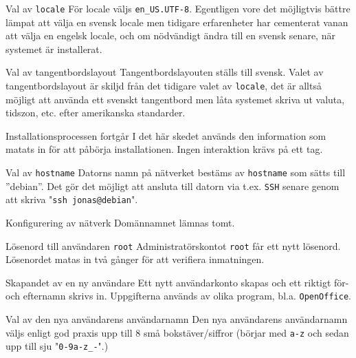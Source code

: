            {Val av \texttt{locale}}
           {För locale väljs \texttt{en\_US.UTF-8}. Egentligen vore det möjligtvis
            bättre lämpat att välja en svensk locale men tidigare erfarenheter har
            cementerat vanan att välja en engelsk locale, och om nödvändigt
            ändra till en svensk senare, när systemet är installerat.}
           {}

           {Val av tangentbordslayout}
           {Tangentbordslayouten ställs till svensk. Valet av
            tangentbordslayout är skiljd från det tidigare valet av
            \texttt{locale}, det är alltså möjligt att använda ett svenskt
            tangentbord men låta systemet skriva ut valuta, tidszon, etc. efter
            amerikanska standarder.
            }
           {}

           {Installationsprocessen fortgår}
           {I det här skedet används den information som matats in för att
            påbörja installationen. Ingen interaktion krävs på ett tag.}
           {}

           {Val av \texttt{hostname}}
           {Datorns namn på nätverket bestäms av \texttt{hostname} som sätts till
            ''debian''. Det gör det möjligt att ansluta till datorn via t.ex.
            \texttt{SSH} senare genom att skriva "\texttt{ssh jonas@debian}".}
           {}

           {Konfigurering av nätverk}
           {Domännamnet lämnas tomt.}
           {}

           {Lösenord till användaren \texttt{root}}
           {Administratörskontot \texttt{root} får ett nytt lösenord.
            Lösenordet matas in två gånger för att verifiera inmatningen.}
           {}

           {Skapandet av en ny användare}
           {Ett nytt användarkonto skapas och ett riktigt för- och efternamn
            skrivs in.  Uppgifterna används av olika program, bl.a.
            \texttt{OpenOffice}.}
           {}

           {Val av den nya användarens användarnamn}
           {Den nya användarens användarnamn väljs enligt god praxis
            \parencite{forelasning03} upp till 8 små bokstäver/siffror (börjar
            med \texttt{a-z} och sedan upp till sju "\texttt{0-9a-z_-}".)}
           {}

